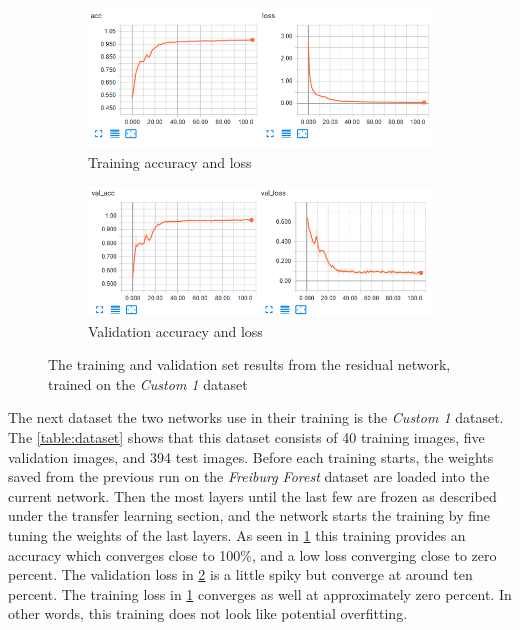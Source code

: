 \documentclass[USenglish]{ifimaster}  %
\begin{document}
\begin{figure}[ht]
\centering
\begin{subfigure}[b]{\textwidth}
\centering
\includegraphics[width=1\textwidth]{bilder/custom_1_training/Custom_1_residual_training_acc_results.png}
\caption{Training accuracy and loss}
\label{fig:custom_1_residual_acc_result}
\end{subfigure}
\hfill
\begin{subfigure}[b]{\textwidth}
\centering
\includegraphics[width=1\textwidth]{bilder/custom_1_training/Custom_1_residual_training_val_acc_results.png}
\caption{Validation accuracy and loss}
\label{fig:custom_1_residual_val_acc_result}
\end{subfigure}
\caption{The training and validation set results from the residual network, trained on the \textit{Custom 1} dataset}
\label{fig:custom_1_residual_result}
\end{figure}

The next dataset the two networks use in their training is the \textit{Custom 1} dataset. The \cref{table:dataset} shows that this dataset consists of 40 training images, five validation images, and 394 test images. Before each training starts, the weights saved from the previous run on the \textit{Freiburg Forest} dataset are loaded into the current network. Then the most layers until the last few are frozen as described under the transfer learning section, and the network starts the training by fine tuning the weights of the last layers. As seen in \cref{fig:custom_1_residual_acc_result} this training provides an accuracy which converges close to 100\%, and a low loss converging close to zero percent. The validation loss in \cref{fig:custom_1_residual_val_acc_result} is a little spiky but converge at around ten percent. The training loss in \cref{fig:custom_1_residual_acc_result} converges as well at approximately zero percent. In other words, this training does not look like potential overfitting. 
\end{document}
